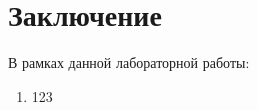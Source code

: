 \documentclass[12pt]{report}
\begin{document}
\chapter*{Заключение}

В рамках данной лабораторной работы:

\begin{enumerate}

	\item 123
\end{enumerate}





\end{document}
